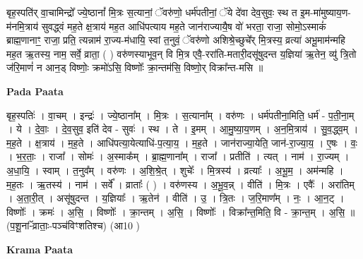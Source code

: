 \documentclass[17pt]{extarticle}
\begin{document}
बृह॒स्पति॑र् वा॒चामिन्द्रो᳚ ज्ये॒ष्ठानां᳚ मि॒त्रः स॒त्यानां॒ ॅवरु॑णो॒ धर्म॑पतीनां॒ ॅये दे॑वा देव॒सुवः॒ स्थ त इ॒म-मा॑मुष्याय॒ण-म॑नमि॒त्राय॑ सुवद्ध्वं मह॒ते क्ष॒त्राय॑ मह॒त आधि॑पत्याय मह॒ते जान॑राज्यायै॒ष वो॑ भरता॒ राजा॒ सोमो॒ऽस्माकं॑ ब्राह्म॒णानाꣳ॒॒ राजा॒ प्रति॒ त्यन्नाम॑ रा॒ज्य-म॑धायि॒ स्वां त॒नुवं॒ ॅवरु॑णो अशिश्रे॒च्छुचे᳚र् मि॒त्रस्य॒ व्रत्या॑ अभू॒माम॑न्महि मह॒त ऋ॒तस्य॒ नाम॒ सर्वे॒ व्राता॒ ( ) वरु॑णस्याभूव॒न् वि मि॒त्र एवै॒-ररा॑ति-मतारी॒दसू॑षुदन्त य॒ज्ञिया॑ ऋ॒तेन॒ व्यु॑ त्रि॒तो ज॑रि॒माणं॑ न आन॒ड् विष्णोः॒ क्रमो॑ऽसि॒ विष्णोः᳚ क्रा॒न्तम॑सि॒ विष्णो॒र् विक्रा᳚न्त-मसि ॥ \newline

\textbf{Pada Paata} \newline

बृह॒स्पतिः॑ । वा॒चम् । इन्द्रः॑ । ज्ये॒ष्ठाना᳚म् । मि॒त्रः । स॒त्याना᳚म् । वरु॑णः । धर्म॑पतीना॒मिति॒ धर्म॑ - प॒ती॒ना॒म् । ये । दे॒वाः॒ । दे॒व॒सुव॒ इति॑ देव - सुवः॑ । स्थ । ते । इ॒मम् । आ॒मु॒ष्या॒य॒णम् । अ॒न॒मि॒त्राय॑ । सु॒व॒द्ध्व॒म् । म॒ह॒ते । क्ष॒त्राय॑ । म॒ह॒ते । आधि॑पत्या॒येत्याधि॑-प॒त्या॒य॒ । म॒ह॒ते । जान॑राज्या॒येति॒ जान॑-रा॒ज्या॒य॒ । ए॒षः । वः॒ । भ॒र॒ताः॒ । राजा᳚ । सोमः॑ । अ॒स्माक᳚म् । ब्रा॒ह्म॒णाना᳚म् । राजा᳚ । प्रतीति॑ । त्यत् । नाम॑ । रा॒ज्यम् । अ॒धा॒यि॒ । स्वाम् । त॒नुव᳚म् । वरु॑णः । अ॒शि॒श्रे॒त् । शुचेः᳚ । मि॒त्रस्य॑ । व्रत्याः᳚ । अ॒भू॒म॒ । अम॑न्महि । म॒ह॒तः । ऋ॒तस्य॑ । नाम॑ । सर्वे᳚ । व्राताः᳚ ( ) । वरु॑णस्य । अ॒भू॒व॒न्न् । वीति॑ । मि॒त्रः । एवैः᳚ । अरा॑तिम् । अ॒ता॒री॒त् । असू॑षुदन्त । य॒ज्ञियाः᳚ । ऋ॒तेन॑ । वीति॑ । उ॒ । त्रि॒तः । ज॒रि॒माण᳚म् । नः॒ । आ॒न॒ट् । विष्णोः᳚ । क्रमः॑ । अ॒सि॒ । विष्णोः᳚ । क्रा॒न्तम् । अ॒सि॒ । विष्णोः᳚ । विक्रा᳚न्त॒मिति॒ वि - क्रा॒न्त॒म् । अ॒सि॒ ॥(प॒शू॒नां-ॅव्राताः॒-पञ्च॑विꣳशतिश्च) (आ10 )  \newline


\textbf{Krama Paata} \newline
\end{document}
